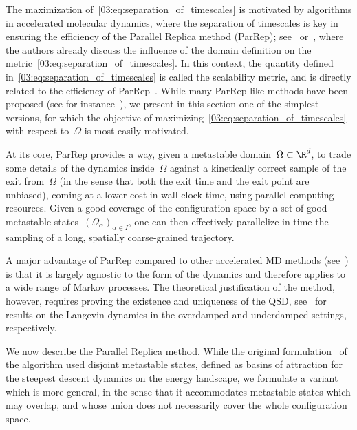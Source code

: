     The maximization of~\eqref{03:eq:separation_of_timescales} is motivated by algorithms in accelerated molecular dynamics, where the separation of timescales is key in ensuring the efficiency of the Parallel Replica method (ParRep); see~\cite[Section 6.2]{SL13} or~\cite[Section 2.7]{PUV15}, where the authors already discuss the influence of the domain definition on the metric~\eqref{03:eq:separation_of_timescales}.
    In this context, the quantity defined in~\eqref{03:eq:separation_of_timescales} is called the scalability metric, and is directly related to the efficiency of ParRep~\cite{V98}.
    While many ParRep-like methods have been proposed (see for instance~\cite{USV07,BLS15,A19,PCWKV16}), we present in this section one of the simplest versions, for which the objective of maximizing~\eqref{03:eq:separation_of_timescales} with respect to~$\Omega$ is most easily motivated.
    
    At its core, ParRep provides a way, given a metastable domain~$\Omega\subset\R^d$, to trade some details of the dynamics inside~$\Omega$ against a kinetically correct sample of the exit from~$\Omega$ (in the sense that both the exit time and the exit point are unbiased), coming at a lower cost in wall-clock time, using parallel computing resources.
    Given a good coverage of the configuration space by a set of good metastable states~$(\Omega_\alpha)_{\alpha\in I}$, one can then effectively parallelize in time the sampling of a long, spatially coarse-grained trajectory.

    A major advantage of ParRep compared to other accelerated MD methods (see~\cite{V97,SV00}) is that it is largely agnostic to the form of the dynamics and therefore applies to a wide range of Markov processes.
    The theoretical justification of the method, however, requires proving the existence and uniqueness of the QSD, see~\cite{LBLLP12,RLR22} for results on the Langevin dynamics in the overdamped and underdamped settings, respectively.
    
    We now describe the Parallel Replica method. While the original formulation~\cite{V98} of the algorithm used disjoint metastable states, defined as basins of attraction for the steepest descent dynamics on the energy landscape,
    we formulate a variant which is more general, in the sense that it accommodates metastable states which may overlap, and whose union does not necessarily cover the whole configuration space.
    

